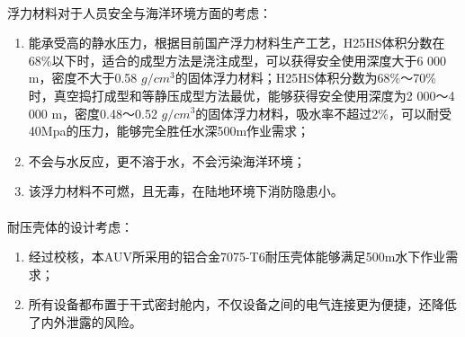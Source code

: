 \documentclass{ctexart}
\begin{document}
    \paragraph{}浮力材料对于人员安全与海洋环境方面的考虑：
    \begin{enumerate}
        \item 能承受高的静水压力，根据目前国产浮力材料生产工艺，H25HS体积分数在68\%以下时，适合的成型方法是浇注成型，可以获得安全使用深度大于6 000 m，密度不大于0.58 $g/cm^3$的固体浮力材料；H25HS体积分数为68\%～70\%时，真空捣打成型和等静压成型方法最优，能够获得安全使用深度为2 000～4 000 m，密度0.48～0.52 $g/cm^3$的固体浮力材料，吸水率不超过2\%，可以耐受40Mpa的压力，能够完全胜任水深500m作业需求；
        \item 不会与水反应，更不溶于水，不会污染海洋环境；
        \item 该浮力材料不可燃，且无毒，在陆地环境下消防隐患小。
    \end{enumerate}
    \paragraph{}耐压壳体的设计考虑：
    \begin{enumerate}
        \item 经过校核，本AUV所采用的铝合金7075-T6耐压壳体能够满足500m水下作业需求；
        \item 所有设备都布置于干式密封舱内，不仅设备之间的电气连接更为便捷，还降低了内外泄露的风险。
    \end{enumerate}
\end{document}
